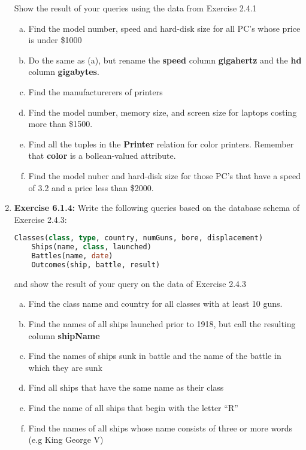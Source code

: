\documentclass[12pt]{article}
\begin{document}
\begin{enumerate}[1.]
    \bigskip

    Show the result of your queries using the data from Exercise 2.4.1

    \bigskip

    \begin{enumerate}[a)]
        \item Find the model number, speed and hard-disk size for all PC's whose
        price is under \$1000
        \item Do the same as (a), but rename the \textbf{speed} column \textbf{gigahertz}
        and the \textbf{hd} column \textbf{gigabytes}.
        \item Find the manufacturerers of printers
        \item Find the model number, memory size, and screen size for laptops costing
        more than \$1500.
        \item Find all the tuples in the \textbf{Printer} relation for color printers.
        Remember that \textbf{color} is a bollean-valued attribute.
        \item Find the model nuber and hard-disk size for those PC's that have a
        speed of 3.2 and a price less than \$2000.
    \end{enumerate}

    \item \textbf{Exercise 6.1.4:} Write the following queries based on the database
    schema of Exercise 2.4.3:

    \bigskip

    \begin{lstlisting}[language=SQL]
    Classes(class, type, country, numGuns, bore, displacement)
    Ships(name, class, launched)
    Battles(name, date)
    Outcomes(ship, battle, result)
    \end{lstlisting}

    \bigskip

    and show the result of your query on the data of Exercise 2.4.3

    \bigskip

    \begin{enumerate}[a)]
        \item Find the class name and country for all classes with at least 10 guns.
        \item Find the names of all ships launched prior to 1918, but call the resulting
        column \textbf{shipName}
        \item Find the names of ships sunk in battle and the name of the battle
        in which they are sunk
        \item Find all ships that have the same name as their class
        \item Find the name of all ships that begin with the letter ``R''
        \item Find the names of all ships whose name consists of three or more words
        (e.g King George V)
    \end{enumerate}


\end{enumerate}
\end{document}

